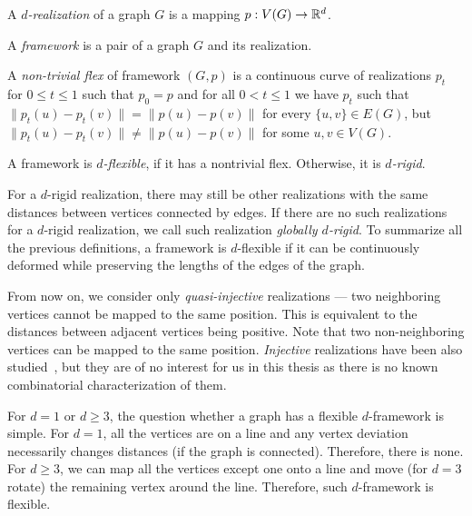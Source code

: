 %
\begin{definition}[\( d \)-realization]
	A \emph{\( d \)-realization} of a graph \( G \) is a mapping \( p: V(G) \to \mathbb{R}^d \).
\end{definition}
%
\begin{definition}[Framework]
	A \emph{framework} is a pair of a graph \( G \) and its realization.
\end{definition}
%
\begin{definition}
	A \emph{non-trivial flex} of framework \( (G, p) \) is a continuous curve of realizations \( p_t \)
	for \( 0 \le t \le 1\) such that
	\( p_0 = p \) and for all \( 0 < t \le 1 \)
	we have \( p_t \) such that
	\( \|p_t(u) - p_t(v)\| = \|p(u) - p(v)\|\) for every \( \{u, v\} \in E(G) \),
	but \( \|p_t(u) - p_t(v)\| \ne \|p(u) - p(v)\| \) for some \( u, v \in V (G) \).
\end{definition}
%
\begin{definition}
	A framework is \emph{\( d \)-flexible}, if it has a nontrivial flex.
	Otherwise, it is \emph{\( d \)-rigid}.
\end{definition}
%
For a \( d \)-rigid realization, there may still be other realizations
with the same distances between vertices connected by edges.
If there are no such realizations for a \( d \)-rigid realization,
we call such realization \emph{globally \( d \)-rigid}.
To summarize all the previous definitions,
a framework is \( d \)-flexible if it can be continuously deformed
while preserving the lengths of the edges of the graph.

From now on, we consider only \emph{quasi-injective} realizations ---
two neighboring vertices cannot be mapped to the same position.
This is equivalent to the distances between adjacent vertices being positive.
Note that two non-neighboring vertices can be mapped to the same position.
\emph{Injective} realizations have been also studied~\cite{injective_realizations},
but they are of no interest for us in this thesis
as there is no known combinatorial characterization of them.

For \( d = 1 \) or \( d \ge 3 \),
the question whether a graph has a flexible \( d \)-framework is simple.
%
For \( d = 1 \), all the vertices are on a line
and any vertex deviation necessarily changes distances (if the graph is connected).
Therefore, there is none.
%
For \( d \ge 3 \), we can map all the vertices except one onto a line and
move (for \( d=3 \) rotate) the remaining vertex around the line.
Therefore, such \( d \)-framework is flexible.

